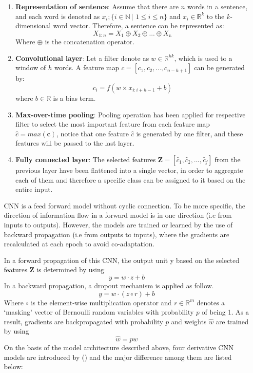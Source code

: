 \documentclass[]{krantz}
\begin{document}
\begin{enumerate}
\def\labelenumi{\arabic{enumi}.}
\item
  \textbf{Representation of sentence}: Assume that there are \(n\) words in a sentence, and each word is denoted as \(x_{i};\{i \in \mathbb{N} \mid 1 \leq i \leq n \}\) and \(x_{i} \in \mathbb{R}^{k}\) to the \(k\)-dimensional word vector. Therefore, a sentence can be represented as:
  \[ X_{1:n}=X_{1} \oplus X_{2} \oplus ... \oplus X_{n} \]
  Where \(\oplus\) is the concatenation operator.
\item
  \textbf{Convolutional layer}: Let a filter denote as \(w \in \mathbb{R}^{hk}\), which is used to a window of \(h\) words. A feature map \(c=[c_1,c_2,…,c_{n-h+1}]\) can be generated by:
  \[ c_i=f(w×x_{i:i+h-1}+b) \]
  where \(b \in \mathbb{R}\) is a bias term.
\item
  \textbf{Max-over-time pooling}: Pooling operation has been applied for respective filter to select the most important feature from each feature map \(\hat{c} =max(\boldsymbol{c})\), notice that one feature \(\hat{c}\) is generated by one filter, and these features will be passed to the last layer.
\item
  \textbf{Fully connected layer}: The selected features \(\boldsymbol{Z}=[\hat{c}_1,\hat{c}_2,…,\hat{c}_j]\) from the previous layer have been flattened into a single vector, in order to aggregate each of them and therefore a specific class can be assigned to it based on the entire input.
\end{enumerate}

CNN is a feed forward model without cyclic connection. To be more specific, the direction of information flow in a forward model is in one direction (i.e from inputs to outputs). However, the models are trained or learned by the use of backward propagation (i.e from outputs to inputs), where the gradients are recalculated at each epoch to avoid co-adaptation.

In a forward propagation of this CNN, the output unit y based on the selected features \(\boldsymbol{Z}\) is determined by using
\[y=w \cdot z+b\]
In a backward propagation, a dropout mechanism is applied as follow.
\[y=w \cdot (z \circ r)+b\]
Where \(\circ\) is the element-wise multiplication operator and \(r \in \mathbb{R}^{m}\) denotes a `masking' vector of Bernoulli random variables with probability \(p\) of being 1. As a result, gradients are backpropagated with probability \(p\) and weights \(\hat{w}\) are trained by using
\[\hat{w}=pw\]
On the basis of the model architecture described above, four derivative CNN models are introduced by (\citet{Kim2014ConvolutionalNN}) and the major difference among them are listed below:
\end{document}
